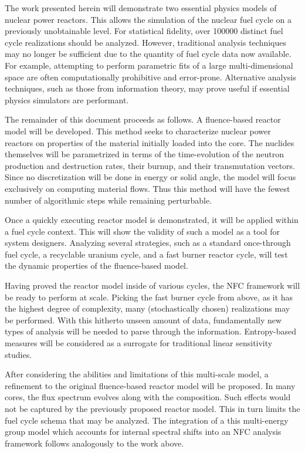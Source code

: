 The work presented herein will demonstrate two essential physics models of nuclear power reactors.
This allows the simulation of the nuclear fuel cycle on a previously unobtainable level.
For statistical fidelity, over 100000 distinct fuel cycle realizations should be analyzed.  
However, traditional analysis techniques may no longer be sufficient due to the quantity of fuel cycle data now 
available. For example, attempting to perform parametric fits of a large multi-dimensional 
space are often computationally prohibitive and error-prone.
Alternative analysis techniques, such as those from information theory, may prove useful
if essential physics simulators are performant.

The remainder of this document proceeds as follows.  
A fluence-based reactor model will be developed.  This method seeks to characterize nuclear power
reactors on properties of the material initially loaded into the core.  The nuclides
themselves will be parametrized in terms of the time-evolution of the neutron production 
and destruction rates, their burnup, and their transmutation vectors.  Since no discretization
will be done in energy or solid angle, the model will focus exclusively on computing 
material flows.  Thus this method will have the fewest number of algorithmic steps while 
remaining perturbable. 

Once a quickly executing reactor model is demonstrated, it will be applied within a fuel
cycle context.  This will show the validity of such a model as a tool for system designers.
Analyzing several strategies, such as a standard once-through fuel cycle, a recyclable uranium
cycle, and a fast burner reactor cycle, will test the dynamic properties of the fluence-based
model.  

Having proved the reactor model inside of various cycles, the NFC framework will be ready to 
perform at scale.  Picking the fast burner cycle from above, as it has the highest degree of complexity, 
many (stochastically chosen) realizations may be performed.  With this hitherto unseen amount of data, 
fundamentally new types of analysis will be needed to parse through the information.  Entropy-based measures
will be considered as a surrogate for traditional linear sensitivity studies.

After considering the abilities and limitations of this multi-scale model, a refinement to 
the original fluence-based reactor model will be proposed.  In many cores, the flux spectrum
evolves along with the composition.  Such effects would not be captured by the previously 
proposed reactor model.  This in turn limits the fuel cycle schema that may be analyzed.
The integration of a this multi-energy group model which 
accounts for internal spectral shifts into an NFC analysis framework follows
analogously to the work above.

